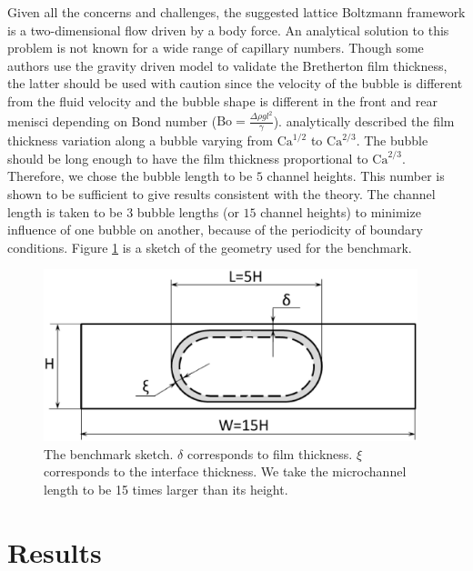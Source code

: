 \documentclass[preprint,12pt]{elsarticle}
\newcommand{\Ca}{\mathrm{Ca}}
\begin{document}
Given all the concerns and challenges, the suggested lattice Boltzmann framework
is a two-dimensional flow driven by a body force.  An analytical
solution to this problem is not known for a wide range of capillary
numbers.
Though some authors \cite{sehgal-microchannel} use the gravity driven model to
validate the Bretherton film thickness, the latter should be used with caution
since the velocity of the bubble is different from the fluid velocity and the
bubble shape
is different in the front and rear menisci depending on Bond number ($\mathrm{Bo}=\frac{\Delta \rho g
l^2}{\gamma}$). \citet{wong-films}
analytically described the film thickness variation along a bubble varying from $\Ca^{1/2}$ to
$\Ca^{2/3}$. The bubble should be long enough to have the film thickness proportional to
$\Ca^{2/3}$. Therefore, we chose the bubble length to be $5$ channel heights. This number is shown
to be sufficient to give results consistent with the theory. The
channel length is taken to be $3$ bubble lengths (or $15$ channel heights)
to minimize influence of one bubble on another,
because of the periodicity of boundary conditions.
Figure \ref{fig:benchmark:sketch} is a sketch of the geometry
used for the benchmark.
\begin{figure}
\includegraphics[width=0.97\textwidth]{Figures/benchmark.eps}
\caption{The benchmark sketch. $\delta$ corresponds to film thickness. $\xi$ corresponds to the interface thickness. We take the microchannel length to be 15 times larger than its height.
\label{fig:benchmark:sketch}}
\end{figure}


\section{Results}
\end{document}
